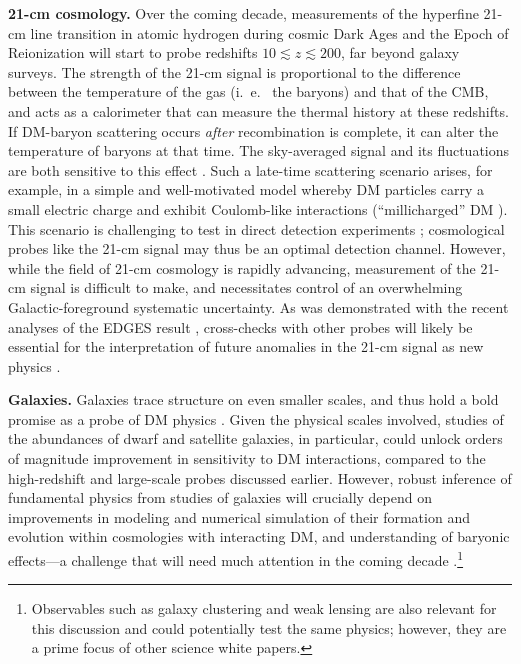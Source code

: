 \documentclass[12pt]{article}
\begin{document}
\textbf{21-cm cosmology.} 
Over the coming decade, measurements of the hyperfine 21-cm line transition in atomic hydrogen during cosmic Dark Ages and the Epoch of Reionization will start to probe redshifts $10 \lesssim z \lesssim 200$, far beyond galaxy surveys.
The strength of the 21-cm signal is proportional to the difference between the temperature of the gas (i.~e.~ the baryons) and that of the CMB, and acts as a calorimeter that can measure the thermal history at these redshifts.
If DM-baryon scattering occurs \textit{after} recombination is complete, it can alter the temperature of baryons at that time. 
The sky-averaged signal and its fluctuations are both sensitive to this effect \cite{Munoz_15, Barkana_18, Fialkov_18, Munoz_18,2018arXiv180210094M}.
Such a late-time scattering scenario arises, for example, in a simple and well-motivated model whereby DM particles carry a small electric charge and exhibit Coulomb-like interactions (``millicharged'' DM \cite{2017arXiv170704591B,2019arXiv190208623D}).
This scenario is challenging to test in direct detection experiments \cite{2011PhRvD..83f3509M}; cosmological probes like the 21-cm signal may thus be an optimal detection channel.
However, while the field of 21-cm cosmology is rapidly advancing, measurement of the 21-cm signal is difficult to make, and necessitates control of an overwhelming Galactic-foreground systematic uncertainty. 
As was demonstrated with the recent analyses of the EDGES result \cite{Bowman_18}, cross-checks with other probes will likely be essential for the interpretation of future anomalies in the 21-cm signal as new physics \cite{Barkana:2018lgd,Kovetz:2018zan,Berlin:2018sjs}. 

\textbf{Galaxies.}
Galaxies trace structure on even smaller scales, and thus hold a bold promise as a probe of DM physics \cite{2019arXiv190201055D}.
Given the physical scales involved, studies of the abundances of dwarf and satellite galaxies, in particular, could unlock orders of magnitude improvement in sensitivity to DM interactions, compared to the high-redshift and large-scale probes discussed earlier.
However, robust inference of fundamental physics from studies of galaxies will crucially depend on improvements in modeling and numerical simulation of their formation and evolution within cosmologies with interacting DM, and understanding of baryonic effects---a challenge that will need much attention in the coming decade \cite{2019arXiv190201055D}.\footnote{Observables such as galaxy clustering and weak lensing are also relevant for this discussion and could potentially test the same physics; however, they are a prime focus of other science white papers.}
\end{document}
